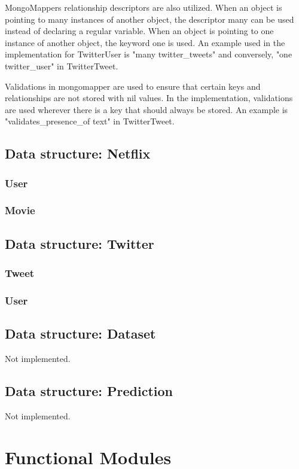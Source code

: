 MongoMappers relationship descriptors are also utilized. When an object is pointing to many instances of another object, the descriptor many can be used instead of declaring a regular variable. When an object is pointing to one instance of another object, the keyword one is used. An example used in the implementation for TwitterUser is "many twitter\_tweets" and conversely, "one twitter\_user" in TwitterTweet.

Validations in mongomapper are used to ensure that certain keys and relationships are not stored with nil values. In the implementation, validations are used wherever there is a key that should always be stored. An example is "validates\_presence\_of text" in TwitterTweet.


\subsection{Data structure: Netflix}
\subsubsection{User}
\subsubsection{Movie}

\subsection{Data structure: Twitter}
\subsubsection{Tweet}
\subsubsection{User}

\subsection{Data structure: Dataset}
Not implemented.
\subsection{Data structure: Prediction}
Not implemented.

\section{Functional Modules}\label{impl:Functional Modules}

